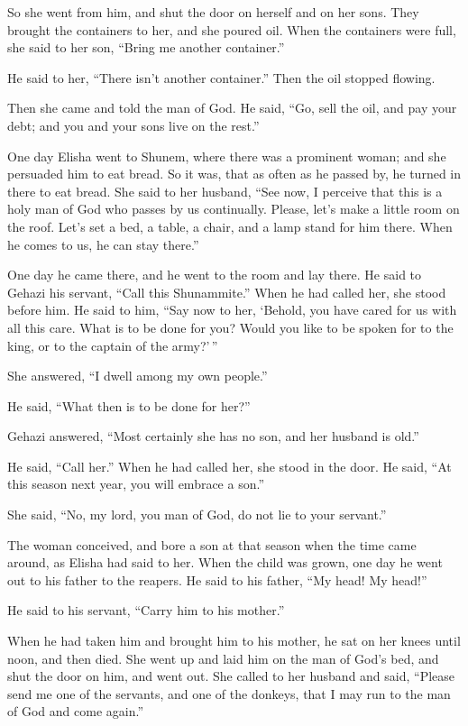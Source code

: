  So she went from him, and shut the door on herself and on
her sons. They brought the containers to her, and she poured oil.
 When the containers were full, she said to her son, ``Bring
me another container.''

He said to her, ``There isn't another container.'' Then the oil stopped
flowing.

 Then she came and told the man of God. He said, ``Go, sell
the oil, and pay your debt; and you and your sons live on the rest.''

 One day Elisha went to Shunem, where there was a prominent
woman; and she persuaded him to eat bread. So it was, that as often as
he passed by, he turned in there to eat bread.  She said to
her husband, ``See now, I perceive that this is a holy man of God who
passes by us continually.  Please, let's make a little room
on the roof. Let's set a bed, a table, a chair, and a lamp stand for him
there. When he comes to us, he can stay there.''

 One day he came there, and he went to the room and lay
there.  He said to Gehazi his servant, ``Call this
Shunammite.'' When he had called her, she stood before him.
 He said to him, ``Say now to her, `Behold, you have cared
for us with all this care. What is to be done for you? Would you like to
be spoken for to the king, or to the captain of the army?'\,''

She answered, ``I dwell among my own people.''

 He said, ``What then is to be done for her?''

Gehazi answered, ``Most certainly she has no son, and her husband is
old.''

 He said, ``Call her.'' When he had called her, she stood
in the door.  He said, ``At this season next year, you will
embrace a son.''

She said, ``No, my lord, you man of God, do not lie to your servant.''

 The woman conceived, and bore a son at that season when
the time came around, as Elisha had said to her.  When the
child was grown, one day he went out to his father to the reapers.
 He said to his father, ``My head! My head!''

He said to his servant, ``Carry him to his mother.''

 When he had taken him and brought him to his mother, he
sat on her knees until noon, and then died.  She went up
and laid him on the man of God's bed, and shut the door on him, and went
out.  She called to her husband and said, ``Please send me
one of the servants, and one of the donkeys, that I may run to the man
of God and come again.''


